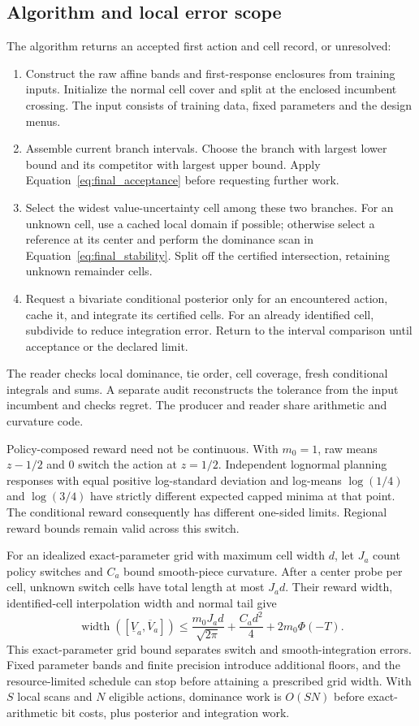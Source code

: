 \subsection{Algorithm and local error scope}

The algorithm returns an accepted first action and cell record, or unresolved:
\begin{enumerate}
\item Construct the raw affine bands and first-response enclosures from training inputs. Initialize the normal cell cover and split at the enclosed incumbent crossing. The input consists of training data, fixed parameters and the design menus.
\item Assemble current branch intervals. Choose the branch with largest lower bound and its competitor with largest upper bound. Apply Equation~\eqref{eq:final_acceptance} before requesting further work.
\item Select the widest value-uncertainty cell among these two branches. For an unknown cell, use a cached local domain if possible; otherwise select a reference at its center and perform the dominance scan in Equation~\eqref{eq:final_stability}. Split off the certified intersection, retaining unknown remainder cells.
\item Request a bivariate conditional posterior only for an encountered action, cache it, and integrate its certified cells. For an already identified cell, subdivide to reduce integration error. Return to the interval comparison until acceptance or the declared limit.
\end{enumerate}
The reader checks local dominance, tie order, cell coverage, fresh conditional integrals and sums. A separate audit reconstructs the tolerance from the input incumbent and checks regret. The producer and reader share arithmetic and curvature code.

Policy-composed reward need not be continuous. With $m_0=1$, raw means $z-1/2$ and $0$ switch the action at $z=1/2$. Independent lognormal planning responses with equal positive log-standard deviation and log-means $\log(1/4)$ and $\log(3/4)$ have strictly different expected capped minima at that point. The conditional reward consequently has different one-sided limits. Regional reward bounds remain valid across this switch.

For an idealized exact-parameter grid with maximum cell width $d$, let $J_a$ count policy switches and $C_a$ bound smooth-piece curvature. After a center probe per cell, unknown switch cells have total length at most $J_ad$. Their reward width, identified-cell interpolation width and normal tail give
\begin{equation}
\operatorname{width}([\underline V_a,\overline V_a])\le
\frac{m_0J_ad}{\sqrt{2\pi}}+\frac{C_ad^2}{4}+2m_0\Phi(-T).
\label{eq:final_local_error}
\end{equation}
This exact-parameter grid bound separates switch and smooth-integration errors. Fixed parameter bands and finite precision introduce additional floors, and the resource-limited schedule can stop before attaining a prescribed grid width. With $S$ local scans and $N$ eligible actions, dominance work is $O(SN)$ before exact-arithmetic bit costs, plus posterior and integration work.
